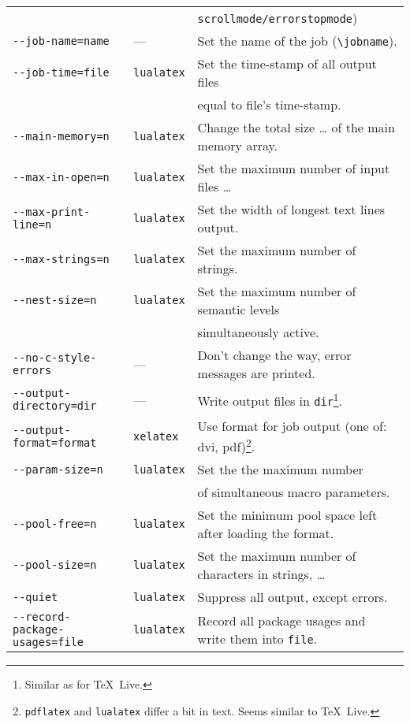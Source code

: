\documentclass{article}
\newcommand{\pdflatex}{\texttt{pdflatex}}
\newcommand{\lualatex}{\texttt{lualatex}}
\newcommand{\xelatex}{\texttt{xelatex}}
\newcommand{\texlive}{\TeX~Live}
\begin{document}
{\begin{longtable}{|lll|}
&& \texttt{scrollmode/errorstopmode}) \\
\texttt{-{}-job-name=name}           & ---         & Set the name of the job (\texttt{\textbackslash{}jobname}). \\
\texttt{-{}-job-time=file}           & \lualatex{} & Set the time-stamp of all output files \\
                                     &             & equal to file's time-stamp. \\
\texttt{-{}-main-memory=n}           & \lualatex{} & Change the total size \dots{} of the main memory array. \\
\texttt{-{}-max-in-open=n}           & \lualatex{} & Set the maximum number of input files \dots \\
\texttt{-{}-max-print-line=n}        & \lualatex{} & Set the width of longest text lines output. \\
\texttt{-{}-max-strings=n}           & \lualatex{} & Set the maximum number of strings. \\
\texttt{-{}-nest-size=n}             & \lualatex{} & Set the maximum number of semantic levels \\
                                     &             & simultaneously active. \\
\texttt{-{}-no-c-style-errors}       & ---         & Don't change the way, error messages are printed. \\
\texttt{-{}-output-directory=dir}    & ---         & Write output files in \texttt{dir}\footnote%
{Similar as for \texlive. }. \\
\texttt{-{}-output-format=format}    & \xelatex{}  & Use format for job output (one of: dvi, pdf)\footnote%
{\pdflatex{} and \lualatex{} differ a bit in text. Seems similar to \texlive. }. \\
\texttt{-{}-param-size=n}            & \lualatex{} & Set the the maximum number \\
                                     &             & of simultaneous macro parameters. \\
\texttt{-{}-pool-free=n}             & \lualatex{} & Set the minimum pool space left after loading the format. \\
\texttt{-{}-pool-size=n}             & \lualatex{} & Set the maximum number of characters in strings, \dots \\
\texttt{-{}-quiet}                   & \lualatex{} & Suppress all output, except errors. \\
\texttt{-{}-record-package-usages=file} & \lualatex{} & Record all package usages and write them into \texttt{file}. \\

\end{longtable}}
\end{document}
